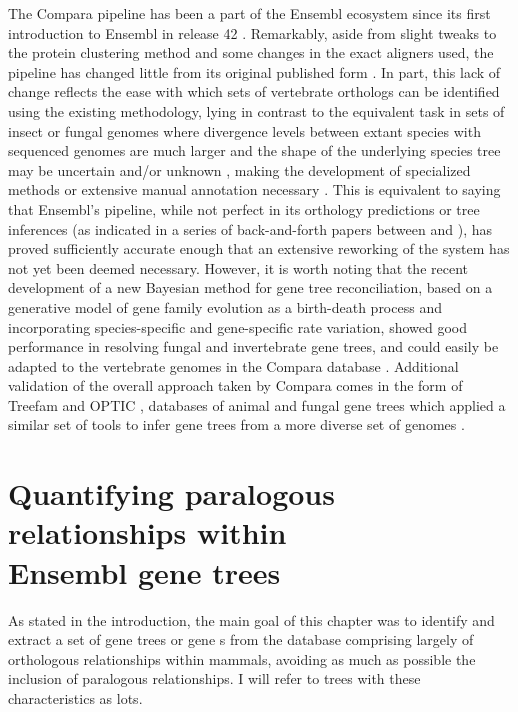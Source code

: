 The Compara pipeline has been a part of the Ensembl ecosystem since
its first introduction to Ensembl in release 42
\citep{Birney2006}. Remarkably, aside from slight tweaks to the
protein clustering method and some changes in the exact aligners used,
the pipeline has changed little from its original published form
\citep{Vilella2009}. In part, this lack of change reflects the ease
with which sets of vertebrate orthologs can be identified using the
existing methodology, lying in contrast to the equivalent task in sets
of insect or fungal genomes where divergence levels between extant
species with sequenced genomes are much larger \citep{Siepel2005} and
the shape of the underlying species tree may be uncertain and/or
unknown \citep{MacKenzie2008a}, making the development of specialized
methods or extensive manual annotation necessary
\citep{Kellis2004,Rasmussen2007}. This is equivalent to saying that
Ensembl's pipeline, while not perfect in its orthology predictions or
tree inferences (as indicated in a series of back-and-forth papers
between \citet{Milinkovitch2010} and \citet{Vilella2011}), has proved
sufficiently accurate enough that an extensive reworking of the system
has not yet been deemed necessary. However, it is worth noting that
the recent development of a new Bayesian method for gene tree
reconciliation, based on a generative model of gene family evolution
as a birth-death process and incorporating species-specific and
gene-specific rate variation, showed good performance in resolving
fungal and invertebrate gene trees, and could easily be adapted to the
vertebrate genomes in the Compara database
\citep{Rasmussen2011}. Additional validation of the overall approach
taken by Compara comes in the form of Treefam and OPTIC
\citep{Ruan2008,Heger2008}, databases of animal and fungal gene trees
which applied a similar set of tools to infer gene trees from a more
diverse set of genomes \citep{Vilella2009}.

\section[Quantifying paralogous relationships within Ensembl gene trees]{Quantifying paralogous relationships within \\ Ensembl gene trees}
\label{section_quantifying_paralogous}

As stated in the introduction, the main goal of this chapter was to
identify and extract a set of gene trees or gene \subtr{}s from the
\cmp database comprising largely of orthologous relationships within
mammals, avoiding as much as possible the inclusion of paralogous
relationships. I will refer to trees with these characteristics as
\acp{lot}.

